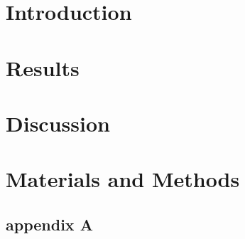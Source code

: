 \documentclass[draft]{Thesis}
\begin{document}
\setcounter{tocdepth}{3} %
\listoftodos
\frontmatter




\part{Introduction}












\part{Results}



\part{Discussion}

\part{Materials and Methods}
\appendix
\chapter{appendix A}
\blindtext[4]

\singlespacing


\end{document}
